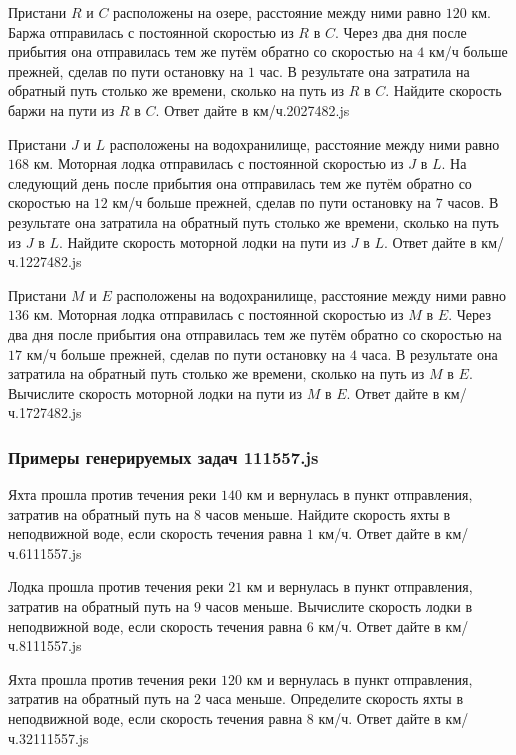 \par{Пристани $R$ и $C$ расположены на озере, расстояние между ними равно $120$ км. Баржа отправилась с постоянной скоростью из $R$ в $C$. Через два дня после прибытия она отправилась тем же путём обратно со скоростью на $4$ км/ч больше прежней, сделав по пути остановку на $1$ час. В результате она затратила на обратный путь столько же времени, сколько на путь из $R$ в $C$. Найдите скорость баржи на пути из $R$ в $C$. Ответ дайте в км/ч.}{20}{27482.js}
\par{Пристани $J$ и $L$ расположены на водохранилище, расстояние между ними равно $168$ км. Моторная лодка отправилась с постоянной скоростью из $J$ в $L$. На следующий день после прибытия она отправилась тем же путём обратно со скоростью на $12$ км/ч больше прежней, сделав по пути остановку на $7$ часов. В результате она затратила на обратный путь столько же времени, сколько на путь из $J$ в $L$. Найдите скорость моторной лодки на пути из $J$ в $L$. Ответ дайте в км/ч.}{12}{27482.js}
\par{Пристани $M$ и $E$ расположены на водохранилище, расстояние между ними равно $136$ км. Моторная лодка отправилась с постоянной скоростью из $M$ в $E$. Через два дня после прибытия она отправилась тем же путём обратно со скоростью на $17$ км/ч больше прежней, сделав по пути остановку на $4$ часа. В результате она затратила на обратный путь столько же времени, сколько на путь из $M$ в $E$. Вычислите скорость моторной лодки на пути из $M$ в $E$. Ответ дайте в км/ч.}{17}{27482.js}


\subsubsection*{Примеры генерируемых задач 111557.js}

\par{Яхта прошла против течения реки $140$ км и вернулась в пункт отправления, затратив на обратный путь на $8$ часов меньше. Найдите скорость яхты в неподвижной воде, если скорость течения равна $1$ км/ч. Ответ дайте в км/ч.}{6}{111557.js}
\par{Лодка прошла против течения реки $21$ км и вернулась в пункт отправления, затратив на обратный путь на $9$ часов меньше. Вычислите скорость лодки в неподвижной воде, если скорость течения равна $6$ км/ч. Ответ дайте в км/ч.}{8}{111557.js}
\par{Яхта прошла против течения реки $120$ км и вернулась в пункт отправления, затратив на обратный путь на $2$ часа меньше. Определите скорость яхты в неподвижной воде, если скорость течения равна $8$ км/ч. Ответ дайте в км/ч.}{32}{111557.js}

